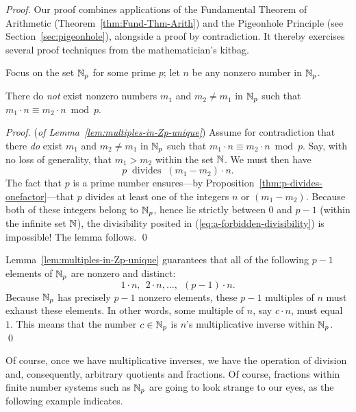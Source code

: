 \begin{proof}
Our proof combines applications of the Fundamental Theorem of Arithmetic (Theorem~\ref{thm:Fund-Thm-Arith}) and the Pigeonhole Principle (see Section~\ref{sec:pigeonhole}), alongside a proof by contradiction.  It thereby exercises several proof techniques from the mathematician's kitbag.

\smallskip

Focus on the set $\mathbb{N}_p$ for some prime $p$; let $n$ be any nonzero number in $\mathbb{N}_p$.  

\begin{lemma}
\label{lem:multiples-in-Zp-unique}
There do {\em not} exist nonzero numbers $m_1$ and $m_2 \neq m_1$ in $\mathbb{N}_p$ such that $m_1 \cdot n \equiv m_2 \cdot n \bmod p$.
\end{lemma}

\begin{proof} ({\em of Lemma~\ref{lem:multiples-in-Zp-unique}})
Assume for contradiction that there {\em do} exist $m_1$ and $m_2 \neq m_1$ in $\mathbb{N}_p$ such that $m_1 \cdot n \equiv m_2 \cdot n \bmod p$.  Say, with no loss of generality, that $m_1 > m_2$ within the set $\mathbb{N}$.  We must then have
\begin{equation}
\label{eq:a-forbidden-divisibility}
p \ \mbox{ divides } \ (m_1 - m_2) \cdot n.
\end{equation}
The fact that $p$ is a prime number ensures---by Proposition~\ref{thm:p-divides-onefactor}---that $p$ divides at least one of the integers $n$ or $(m_1 - m_2)$.  Because both of these integers belong to $\mathbb{N}_p$, hence lie strictly between $0$ and $p-1$ (within the infinite set $\mathbb{N}$), the divisibility posited in (\ref{eq:a-forbidden-divisibility}) is impossible!  The lemma follows.  \qed
\end{proof}

Lemma~\ref{lem:multiples-in-Zp-unique} guarantees that all of the following $p-1$ elements of $\mathbb{N}_p$ are nonzero and distinct:
\[ 1 \cdot n, \ \ 2 \cdot n, \ldots, \ \ (p-1) \cdot n. \]
Because $\mathbb{N}_p$ has precisely $p-1$ nonzero elements, these $p-1$ multiples of $n$ must exhaust these elements.  In other words, some multiple of $n$, say $c \cdot n$, must equal $1$.  This means that the number $c \in \mathbb{N}_p$ is $n$'s multiplicative inverse within $\mathbb{N}_p$.  \qed
\end{proof}

\medskip

Of course, once we have multiplicative inverses, we have the operation of division and, consequently, arbitrary quotients and fractions.  Of course, fractions within finite number systems such as $\mathbb{N}_p$ are going to look strange to our eyes, as the following example indicates.

